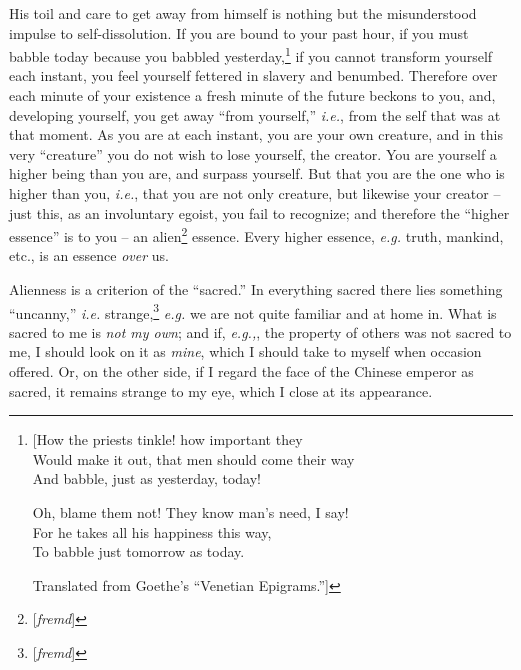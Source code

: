 His toil and care to get away from himself is nothing but the misunderstood 
impulse to self-dissolution. If you are bound to your past hour, if you must 
babble today because you babbled yesterday,\footnote{[How the priests tinkle! 
how important they\\
 Would make it out, that men should come their way\\
 And babble, just as yesterday, today!

Oh, blame them not! They know man's need, I say!\\
 For he takes all his happiness this way,\\
 To babble just tomorrow as today.

Translated from Goethe's ``Venetian Epigrams.'']

} if you cannot transform yourself each instant, you feel yourself fettered in 
slavery and benumbed. Therefore over each minute of your existence a fresh 
minute of the future beckons to you, and, developing yourself, you get away 
``from yourself,'' \textit{i.e.}, from the self that was at that moment. As 
you are at each instant, you are your own creature, and in this very 
``creature'' you do not wish to lose yourself, the creator. You are yourself 
a higher being than you are, and surpass yourself. But that you are the one 
who is higher than you, \textit{i.e.}, that you are not only creature, but 
likewise your creator -- just this, as an involuntary egoist, you fail to 
recognize; and therefore the ``higher essence'' is to you -- an 
alien\footnote{[\textit{fremd}]} essence. Every higher essence, \textit{e.g.} 
truth, mankind, etc., is an essence \textit{over} us.

Alienness is a criterion of the ``sacred.'' In everything sacred there lies 
something ``uncanny,'' \textit{i.e.} strange,\footnote{[\textit{fremd}]} 
\textit{e.g.} we are not quite familiar and at home in. What is sacred to me 
is \textit{not my own}; and if, \textit{e.g.,}, the property of others was 
not sacred to me, I should look on it as \textit{mine}, which I should take to 
myself when occasion offered. Or, on the other side, if I regard the face of 
the Chinese emperor as sacred, it remains strange to my eye, which I close at 
its appearance.

